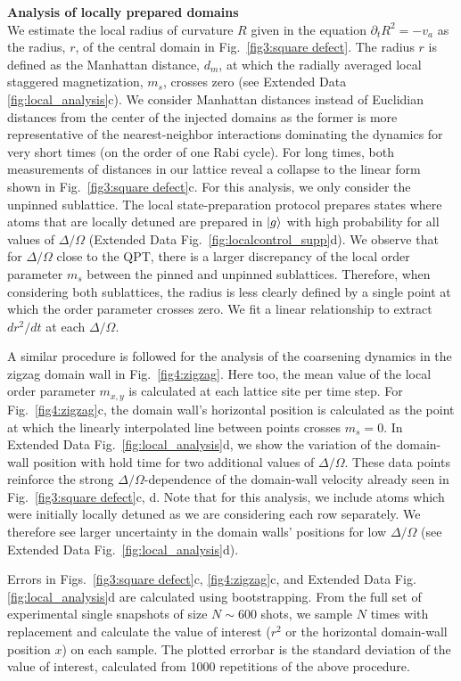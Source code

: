 \documentclass[reprint,twocolumn,secnumarabic,amssymb, aps, prx]{revtex4-2}
\begin{document}
\noindent\textbf{Analysis of locally prepared domains}\\
We estimate the local radius of curvature $R$ given in the equation $\partial_tR^2 = -v_a$ as the radius, $r$, of the central domain in Fig.~\ref{fig3:square defect}. The radius $r$ is defined as the Manhattan distance, $d_m$, at which the radially averaged local staggered magnetization, $m_s$, crosses zero (see Extended Data \ref{fig:local_analysis}c). We consider Manhattan distances instead of Euclidian distances from the center of the injected domains as the former is more representative of the nearest-neighbor interactions dominating the dynamics for very short times (on the order of one Rabi cycle). For long times, both measurements of distances in our lattice reveal a collapse to the linear form shown in Fig.~\ref{fig3:square defect}c. For this analysis, we only consider the unpinned sublattice. The local state-preparation protocol prepares states where atoms that are locally detuned are prepared in $\ket{g}$ with high probability for all values of $\Delta/\Omega$ (Extended Data Fig.~\ref{fig:localcontrol_supp}d). We observe that for $\Delta/\Omega$ close to the QPT, there is a larger discrepancy of the local order parameter $m_s$ between the pinned and unpinned sublattices. Therefore, when considering both sublattices, the radius is less clearly defined by a single point at which the order parameter crosses zero. We fit a linear relationship to extract $dr^2/dt$ at each $\Delta/\Omega$. 

A similar procedure is followed for the analysis of the coarsening dynamics in the zigzag domain wall in Fig.~\ref{fig4:zigzag}. Here too, the mean value of the local order parameter $m_{x,y}$ is calculated at each lattice site per time step. For Fig.~\ref{fig4:zigzag}c, the domain wall's horizontal position is calculated as the point at which the linearly interpolated line between points crosses $m_s = 0$. In Extended Data Fig.~\ref{fig:local_analysis}d, we show the variation of the domain-wall position with hold time for two additional values of $\Delta/\Omega$. These data points reinforce the strong $\Delta/\Omega$-dependence of the domain-wall velocity already seen in Fig.~\ref{fig3:square defect}c, d. Note that for this analysis, we include atoms which were initially locally detuned as we are considering each row separately. We therefore see larger uncertainty in the domain walls' positions for low $\Delta/\Omega$ (see Extended Data Fig.~\ref{fig:local_analysis}d). 

Errors in Figs.~\ref{fig3:square defect}c, \ref{fig4:zigzag}c, and Extended Data Fig.\ref{fig:local_analysis}d are calculated using bootstrapping. From the full set of experimental single snapshots of size $N\sim600$ shots, we sample $N$ times with replacement and calculate the value of interest ($r^2$ or the horizontal domain-wall position $x$) on each sample. The plotted errorbar is the standard deviation of the value of interest, calculated from 1000 repetitions of the above procedure. \\
\end{document}
